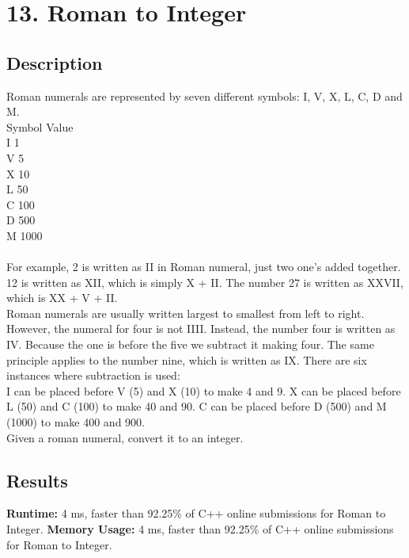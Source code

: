 \chapter{13. Roman to Integer}
\section{Description}
Roman numerals are represented by seven different symbols: I, V, X, L, C, D and M.
\\
Symbol       Value\\
I             1\\
V             5\\
X             10\\
L             50\\
C             100\\
D             500\\
M             1000\\
\\
For example, 2 is written as II in Roman numeral, just two one's added together. 12 is written as XII, which is simply X + II. The number 27 is written as XXVII, which is XX + V + II.
\\
Roman numerals are usually written largest to smallest from left to right. However, the numeral for four is not IIII. Instead, the number four is written as IV. Because the one is before the five we subtract it making four. The same principle applies to the number nine, which is written as IX. There are six instances where subtraction is used:
\\
    I can be placed before V (5) and X (10) to make 4 and 9. 
        X can be placed before L (50) and C (100) to make 40 and 90. 
	    C can be placed before D (500) and M (1000) to make 400 and 900.
\\
	    Given a roman numeral, convert it to an integer.
\\	     
\section{Results}
\textbf{Runtime:}
4 ms, faster than 92.25\% of C++ online submissions for Roman to Integer.
\textbf{Memory Usage:}
4 ms, faster than 92.25\% of C++ online submissions for Roman to Integer.
\newpage
